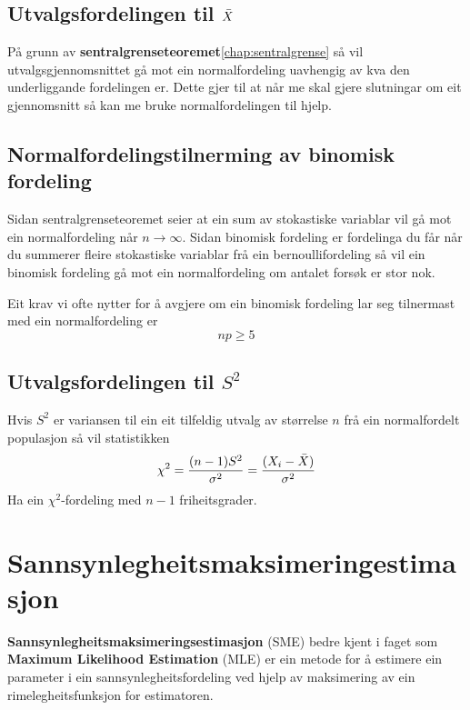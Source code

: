\subsection{Utvalgsfordelingen til \texorpdfstring{$\Bar{X}$}{Utvalgsjennomsnittet}}
På grunn av \textbf{sentralgrenseteoremet}\ref{chap:sentralgrense} så vil utvalgsgjennomsnittet gå mot ein normalfordeling uavhengig av kva den underliggande fordelingen er. Dette gjer til at når me skal gjere slutningar om eit gjennomsnitt så kan me bruke normalfordelingen til hjelp.

\subsection{Normalfordelingstilnerming av binomisk fordeling}
Sidan sentralgrenseteoremet seier at ein sum av stokastiske variablar vil gå mot ein normalfordeling når $n \rightarrow \infty$. Sidan binomisk fordeling er fordelinga du får når du summerer fleire stokastiske variablar frå ein bernoullifordeling så vil ein binomisk fordeling gå mot ein normalfordeling om antalet forsøk er stor nok. 

Eit krav vi ofte nytter for å avgjere om ein binomisk fordeling lar seg tilnermast med ein normalfordeling er
\begin{equation}
    np \geq 5
\end{equation}

\subsection{Utvalgsfordelingen til \texorpdfstring{$S^2$}{Utvalgsvariansen}}
Hvis $S^2$ er variansen til ein eit tilfeldig utvalg av størrelse $n$ frå ein normalfordelt populasjon så vil statistikken
\begin{equation}
    \chi^2 = \frac{(n-1)S^2}{\sigma^2} = \frac{(X_i - \Bar{X})}{\sigma^2}
\end{equation}
Ha ein $\chi^2$-fordeling med $n - 1$ friheitsgrader.

\section{Sannsynlegheitsmaksimeringestimasjon}
\textbf{Sannsynlegheitsmaksimeringsestimasjon} (SME) bedre kjent i faget som \textbf{Maximum Likelihood Estimation} (MLE) er ein metode for å estimere ein parameter i ein sannsynlegheitsfordeling ved hjelp av maksimering av ein rimelegheitsfunksjon for estimatoren.

